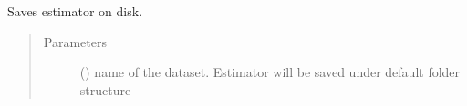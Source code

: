 \documentclass[letterpaper,10pt,english]{sphinxmanual}
\begin{document}
\begin{fulllineitems}
\begin{fulllineitems}
\label{\detokenize{estimators:mleap.estimators.ensemble_estimators.Gradient_Boosting_Classifier.save}}
Saves estimator on disk.
\begin{quote}\begin{description}
\item[{Parameters}] \leavevmode
{} () \textendash{} name of the dataset. Estimator will be saved under default folder structure 

\end{description}\end{quote}

\end{fulllineitems}


\end{fulllineitems}

\end{document}
